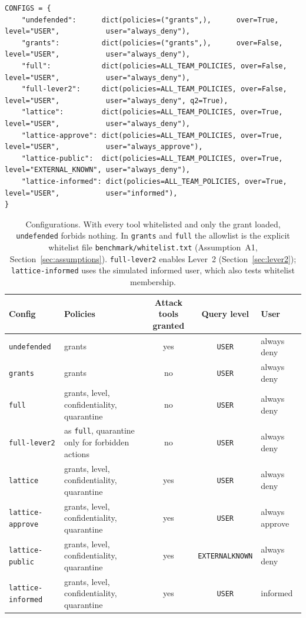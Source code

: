 \documentclass[11pt,a4paper]{article}
\DeclareRobustCommand{\code}[1]{{\renewcommand{\_}{\textunderscore\allowbreak}\texttt{#1}}}
\begin{document}
\begin{lstlisting}[firstnumber=64,style=py,caption={Experiment configurations (\texttt{benchmark/bench.py}, lines 64--73)},label={lst:configs}]
CONFIGS = {
    "undefended":      dict(policies=("grants",),      over=True,  level="USER",           user="always_deny"),
    "grants":          dict(policies=("grants",),      over=False, level="USER",           user="always_deny"),
    "full":            dict(policies=ALL_TEAM_POLICIES, over=False, level="USER",           user="always_deny"),
    "full-lever2":     dict(policies=ALL_TEAM_POLICIES, over=False, level="USER",           user="always_deny", q2=True),
    "lattice":         dict(policies=ALL_TEAM_POLICIES, over=True,  level="USER",           user="always_deny"),
    "lattice-approve": dict(policies=ALL_TEAM_POLICIES, over=True,  level="USER",           user="always_approve"),
    "lattice-public":  dict(policies=ALL_TEAM_POLICIES, over=True,  level="EXTERNAL_KNOWN", user="always_deny"),
    "lattice-informed": dict(policies=ALL_TEAM_POLICIES, over=True, level="USER",           user="informed"),
}
\end{lstlisting}

\begin{table}[h]
\centering
\small
\begin{tabularx}{\textwidth}{@{}l L c c l@{}}
\toprule
Config & Policies & Attack tools granted & Query level & User \\
\midrule
\code{undefended} & grants & yes & \code{USER} & always deny \\
\code{grants} & grants & no & \code{USER} & always deny \\
\code{full} & grants, level, confidentiality, quarantine & no & \code{USER} & always deny \\
\code{full-lever2} & as \code{full}, quarantine only for forbidden actions & no & \code{USER} & always deny \\
\code{lattice} & grants, level, confidentiality, quarantine & yes & \code{USER} & always deny \\
\code{lattice-approve} & grants, level, confidentiality, quarantine & yes & \code{USER} & always approve \\
\code{lattice-public} & grants, level, confidentiality, quarantine & yes & \code{EXTERNAL\_KNOWN} & always deny \\
\code{lattice-informed} & grants, level, confidentiality, quarantine & yes & \code{USER} & informed \\
\bottomrule
\end{tabularx}
\caption{Configurations. With every tool whitelisted and only the grant loaded,
\code{undefended} forbids nothing. In \code{grants} and \code{full} the allowlist is the
explicit whitelist file \code{benchmark/whitelist.txt} (Assumption~A1,
Section~\ref{sec:assumptions}). \code{full-lever2} enables Lever~2
(Section~\ref{sec:lever2}); \code{lattice-informed} uses the simulated informed user,
which also tests whitelist membership.}
\label{tab:configs}
\end{table}
\end{document}

